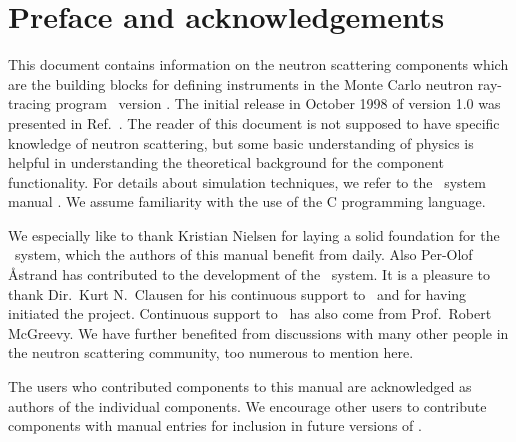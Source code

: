
\chapter*{Preface and acknowledgements}
This document contains information on the neutron scattering components
which are the building blocks for defining instruments
in the Monte Carlo neutron
ray-tracing program \MCS\ version \version . The initial
release in October 1998 of version 1.0 was presented in Ref.~\cite{nn_10_20}.
The reader of this
document is not supposed to have specific knowledge of neutron scattering,
but some basic understanding of physics is helpful in
understanding the theoretical background for the component functionality.
For details about simulation techniques, we refer to
the \MCS\ system manual \cite{mcstasmanual}.
We assume familiarity with the use of
the C programming language.

We especially like to thank Kristian Nielsen for laying a solid foundation
for the \MCS\ system, which the authors of this manual benefit from daily.
Also Per-Olof \AA strand has contributed to the development of
the \MCS\ system.
It is a pleasure to thank Dir.~Kurt N.~Clausen for his continuous
support to \MCS\ and for having initiated the project.
Continuous support to \MCS\ has also come from Prof.~Robert McGreevy.
We have further benefited
from discussions with many other people in the neutron scattering
community, too numerous to mention here.

The users who contributed components to this manual are acknowledged
as authors of the individual components. We encourage other
users to contribute components with manual entries for inclusion in
future versions of \MCS.

